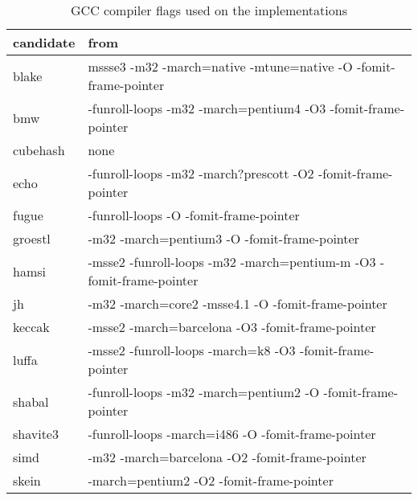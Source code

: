 \begin{table}
  \centering
  \begin{tabular}{ | l | l | }
    \hline
    \textbf{candidate} & \textbf{from}  \\ \hline
     blake       & mssse3 -m32 -march=native -mtune=native -O -fomit-frame-pointer  \\ \hline
     bmw         & -funroll-loops -m32 -march=pentium4 -O3 -fomit-frame-pointer     \\ \hline
     cubehash    & none                                                             \\ \hline
     echo        & -funroll-loops -m32 -march?prescott -O2 -fomit-frame-pointer     \\ \hline
     fugue       & -funroll-loops -O -fomit-frame-pointer                           \\ \hline
     groestl     & -m32 -march=pentium3 -O -fomit-frame-pointer                     \\ \hline
     hamsi       & -msse2 -funroll-loops -m32 -march=pentium-m -O3 -fomit-frame-pointer\\ \hline
     jh          & -m32 -march=core2 -msse4.1 -O -fomit-frame-pointer               \\ \hline
     keccak      & -msse2 -march=barcelona -O3 -fomit-frame-pointer                 \\ \hline
     luffa       & -msse2 -funroll-loops -march=k8 -O3 -fomit-frame-pointer         \\ \hline
     shabal      & -funroll-loops -m32 -march=pentium2 -O -fomit-frame-pointer      \\ \hline
     shavite3    & -funroll-loops -march=i486 -O -fomit-frame-pointer               \\ \hline
     simd        & -m32 -march=barcelona -O2 -fomit-frame-pointer                   \\ \hline
     skein       & -march=pentium2 -O2 -fomit-frame-pointer                         \\ \hline
  \end{tabular}
  \caption{GCC compiler flags used on the implementations}
  \label{tbl:sha3:compilerflags}
\end{table}
